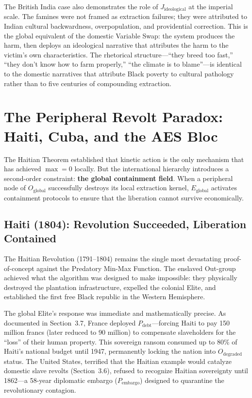 \documentclass[12pt,openany]{book}
\begin{document}
The British India case also demonstrates the role of $J_{\text{ideological}}$ at the imperial scale. The famines were not framed as extraction failures; they were attributed to Indian cultural backwardness, overpopulation, and providential correction. This is the global equivalent of the domestic Variable Swap: the system produces the harm, then deploys an ideological narrative that attributes the harm to the victim's own characteristics. The rhetorical structure---``they breed too fast,'' ``they don't know how to farm properly,'' ``the climate is to blame''---is identical to the domestic narratives that attribute Black poverty to cultural pathology rather than to five centuries of compounding extraction.

\section{The Peripheral Revolt Paradox: Haiti, Cuba, and the AES Bloc}

The Haitian Theorem established that kinetic action is the only mechanism that has achieved $\max = 0$ locally. But the international hierarchy introduces a second-order constraint: \textbf{the global containment field}. When a peripheral node of $O_{\text{global}}$ successfully destroys its local extraction kernel, $E_{\text{global}}$ activates containment protocols to ensure that the liberation cannot survive economically.

\subsection{Haiti (1804): Revolution Succeeded, Liberation Contained}

The Haitian Revolution (1791--1804) remains the single most devastating proof-of-concept against the Predatory Min-Max Function. The enslaved Out-group achieved what the algorithm was designed to make impossible: they physically destroyed the plantation infrastructure, expelled the colonial Elite, and established the first free Black republic in the Western Hemisphere.

The global Elite's response was immediate and mathematically precise. As documented in Section~3.7, France deployed $P_{\text{debt}}$---forcing Haiti to pay 150 million francs (later reduced to 90 million) to compensate slaveholders for the ``loss'' of their human property. This sovereign ransom consumed up to 80\% of Haiti's national budget until 1947, permanently locking the nation into $O_{\text{degraded}}$ status. The United States, terrified that the Haitian example would catalyze domestic slave revolts (Section~3.6), refused to recognize Haitian sovereignty until 1862---a 58-year diplomatic embargo ($P_{\text{embargo}}$) designed to quarantine the revolutionary contagion.
\end{document}
